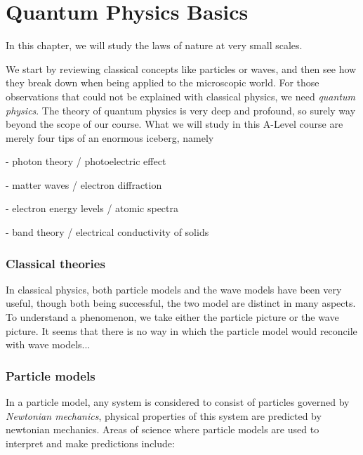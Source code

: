 \chapter{Quantum Physics Basics}

In this chapter, we will study the laws of nature at very small scales.

We start by reviewing classical concepts like particles or waves, and then see how they break down when being applied to the microscopic world. For those observations that could not be explained with classical physics, we need \emph{quantum physics}. The theory of quantum physics is very deep and profound, so surely way beyond the scope of our course. What we will study in this A-Level course are merely four tips of an enormous iceberg, namely

\begin{compactenum}
	\item[-] photon theory / photoelectric effect
	
	\item[-] matter waves / electron diffraction
	
	\item[-] electron energy levels / atomic spectra
	
	\item[-] band theory / electrical conductivity of solids
\end{compactenum}

\subsection{Classical theories}

In classical physics, both particle models and the wave models have been very useful, though both being successful, the two model are distinct in many aspects. To understand a phenomenon, we take either the particle picture or the wave picture. It seems that there is no way in which the particle model would reconcile with wave models...

\subsection{Particle models}

In a particle model, any system is considered to consist of particles governed by \emph{Newtonian mechanics}, physical properties of this system are predicted by newtonian mechanics. Areas of science where particle models are used to interpret and make predictions include:

